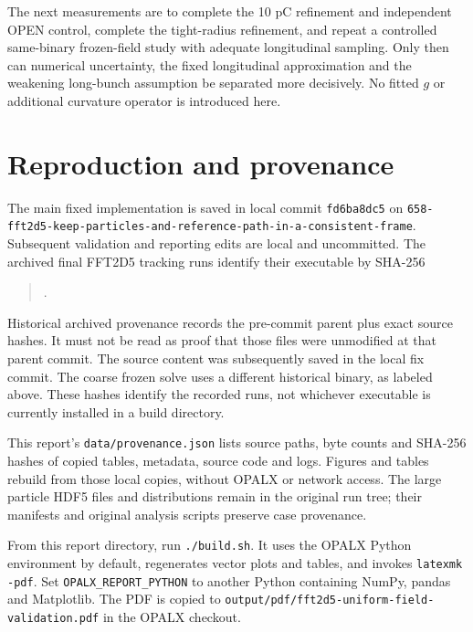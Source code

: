 \documentclass[10pt,a4paper]{article}
\newcommand{\code}[1]{{\small\nolinkurl{#1}}}
\begin{document}
The next measurements are to complete the 10 pC refinement and independent
OPEN control, complete the tight-radius refinement, and repeat a controlled
same-binary frozen-field study with adequate longitudinal sampling. Only then
can numerical uncertainty, the fixed longitudinal approximation and the
weakening long-bunch assumption be separated more decisively. No fitted $g$ or
additional curvature operator is introduced here.

\appendix
\section{Reproduction and provenance}
The main fixed implementation is saved in local commit \code{fd6ba8dc5} on
\code{658-fft2d5-keep-particles-and-reference-path-in-a-consistent-frame}.
Subsequent validation and reporting edits are local and uncommitted. The
archived final FFT2D5 tracking runs identify their executable by SHA-256
\begin{quote}\small\ttfamily
{}.
\end{quote}
Historical archived provenance records the pre-commit parent plus exact source
hashes. It must not be read as proof that those files were unmodified at that
parent commit. The source content was subsequently saved in the local fix commit.
The coarse frozen solve uses a different historical binary, as labeled above.
These hashes identify the recorded runs, not whichever executable is currently
installed in a build directory.

This report's \code{data/provenance.json} lists source paths, byte counts and
SHA-256 hashes of copied tables, metadata, source code and logs. Figures and tables rebuild
from those local copies, without OPALX or network access. The large particle
HDF5 files and distributions remain in the original run tree; their manifests
and original analysis scripts preserve case provenance.

From this report directory, run \code{./build.sh}. It uses the OPALX Python
environment by default, regenerates vector plots and tables, and invokes
\code{latexmk -pdf}. Set \code{OPALX_REPORT_PYTHON} to another Python containing
NumPy, pandas and Matplotlib. The PDF is copied to
\code{output/pdf/fft2d5-uniform-field-validation.pdf} in the OPALX checkout.
\end{document}
